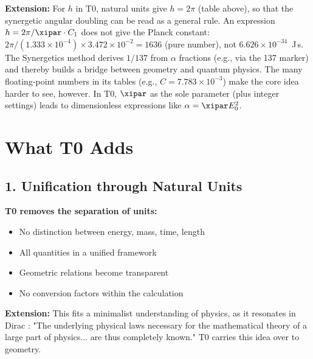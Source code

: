 	\begin{center}
	\end{center}
	
	\textbf{Extension:} For $h$ in T0, natural units give $h = 2\pi$ (table above), so that the synergetic angular doubling can be read as a general rule. An expression $h = 2\pi / \xipar \cdot C_1$ does not give the Planck constant: $2\pi/(1.333\times10^{-4})\times3.472\times10^{-2} = 1636$ (pure number), not $6.626\times10^{-34}$~J\,s. The Synergetics method derives $1/137$ from $\alpha$ fractions (e.g., via the 137 marker) and thereby builds a bridge between geometry and quantum physics. The many floating-point numbers in its tables (e.g., $C = 7.783 \times 10^{-3}$) make the core idea harder to see, however. In T0, $\xipar$ as the sole parameter (plus integer settings) leads to dimensionless expressions like $\alpha = \xipar E_0^2$.
	
	\section{What T0 Adds}
	
	\subsection{1. Unification through Natural Units}
	
	\begin{vorteil}
		\textbf{T0 removes the separation of units:}
		\begin{itemize}
			\item No distinction between energy, mass, time, length
			\item All quantities in a unified framework
			\item Geometric relations become transparent
			\item No conversion factors within the calculation
		\end{itemize}
		
		\textbf{Extension:} This fits a minimalist understanding of physics, as it resonates in Dirac \cite{dirac_principles}: "The underlying physical laws necessary for the mathematical theory of a large part of physics... are thus completely known." T0 carries this idea over to geometry.
	\end{vorteil}
	
